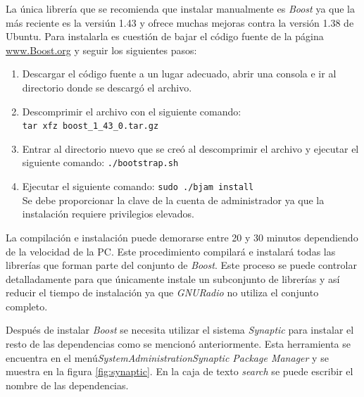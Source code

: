 La \'unica librer\'ia que se recomienda que instalar manualmente es \emph{Boost} ya que la m\'as reciente es la versi\'un 1.43 y
ofrece muchas mejoras contra la versi\'on 1.38 de Ubuntu. Para instalarla es cuesti\'on de bajar el c\'odigo fuente de la p\'agina \url{www.Boost.org} y seguir los siguientes
pasos:

\begin{enumerate}
  \item Descargar el c\'odigo fuente a un lugar adecuado, abrir una consola e
  ir al directorio donde se descarg\'o el archivo.
  \item Descomprimir el archivo con el siguiente comando:\\
  \verb|tar xfz boost_1_43_0.tar.gz|
  \item Entrar al directorio nuevo que se cre\'o al descomprimir el archivo y
  ejecutar el siguiente comando: \verb|./bootstrap.sh|
  \item Ejecutar el siguiente comando: \verb|sudo ./bjam install|\\ Se debe
  proporcionar la clave de la cuenta de administrador ya que la instalaci\'on
  requiere privilegios elevados.
\end{enumerate}

La compilaci\'on e instalaci\'on puede demorarse entre 20 y 30 minutos dependiendo de la velocidad de la PC. Este procedimiento
compilar\'a e instalar\'a todas las librer\'ias que forman parte del conjunto de \emph{Boost}. Este proceso se puede controlar
detalladamente para que \'unicamente instale un subconjunto de librer\'ias y as\'i reducir el tiempo de instalaci\'on ya
que \emph{GNURadio} no utiliza el conjunto completo.

Despu\'es de instalar \emph{Boost} se necesita utilizar el sistema \emph{Synaptic} para instalar el resto de las dependencias
como se mencion\'o anteriormente. Esta herramienta se encuentra en el men\'u\emph{SystemAdministrationSynaptic
Package Manager} y se muestra en la figura \ref{fig:synaptic}. En la caja de texto \emph{search} se puede escribir el nombre
de las dependencias.

